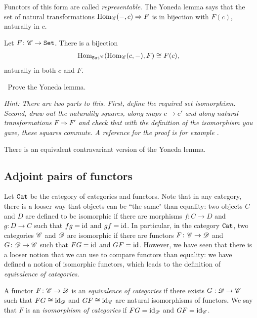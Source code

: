 \documentclass{article}[11pt]
\begin{document}
Functors of this form are called \emph{representable}. The Yoneda lemma says that the set of natural transformations
$\textup{Hom}_{\mathscr{C}}(-,c)\Rightarrow F$ is in bijection with $F(c)$, naturally
in $c$.
\begin{lemma} Let $F\colon \mathscr{C} \to \texttt{Set}$. There is a bijection
\begin{align*}
	\textup{Hom}_{\texttt{Set}^{\mathscr{C}}}(\textup{Hom}_{\mathscr{C}} (c,-), F) \cong F(c),
\end{align*}
naturally in both $c$ and $F$.
\end{lemma}

\begin{exercise} $\ $
Prove the Yoneda lemma.

\emph{Hint: There are two parts to this. First, define the required set isomorphism. Second, draw out the naturality squares, along maps $c\to c'$ and along natural transformations $F\Rightarrow F'$ and check that with the definition  of the isomorphism you gave, these squares commute.  A reference for the proof is for example \cite[Lemma 2.5]{mehrle}.}
\end{exercise}
There is an equivalent contravariant version of the Yoneda lemma.

\subsection{Adjoint pairs of functors}

Let $\texttt{Cat}$ be the category of categories and functors. Note that in any category, there is a looser way that objects can be ``the same" than equality: two objects $C$ and $D$ are defined to be isomorphic if there are morphisms $f\colon C\to D$ and $g\colon D\to C$ such that $fg=\text{id}$ and $gf=\text{id}$. In particular, in the category $\texttt{Cat}$, two categories $\mathscr{C}$ and $\mathscr{D}$ are isomorphic if there are functors $F\colon \mathscr{C}\to \mathscr{D}$ and $G\colon \mathscr{D}\to \mathscr{C}$ such that $FG=\text{id}$ and $GF=\text{id}$. However, we have seen that there is a looser notion that we can use to compare functors than equality: we have defined a notion of isomorphic functors, which leads to the definition of \emph{equivalence of categories}.

\begin{definition}\label{equivcats} A functor $F\colon \mathscr{C} \to \mathscr{D}$ is an \textit{equivalence of categories} if there exists $G : \mathscr{D} \to \mathscr{C}$ such that $FG \cong \text{id}_{\mathscr{D}}$ and $GF\cong \text{id}_{\mathscr{C}}$ are natural isomorphisms of functors. We say that $F$ is an \textit{isomorphism of categories} if $FG = \text{id}_{\mathscr{D}}$ and $GF = \text{id}_{\mathscr{C}}$.
\end{definition}
\end{document}
